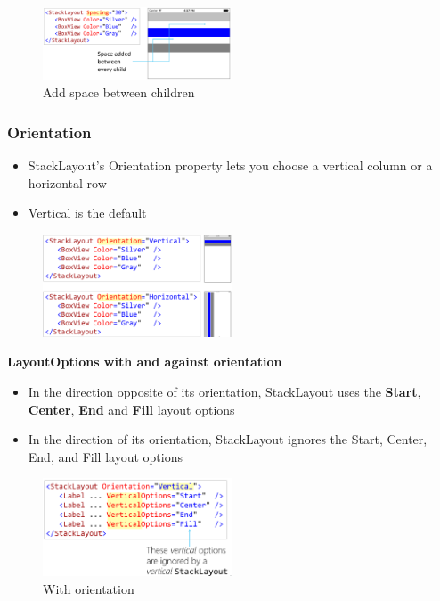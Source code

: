 \documentclass{article}
\newcommand{\bold}[1]{\textbf{#1}}
\begin{document}
\begin{figure}[H]
    \centering
    \includegraphics[width=0.5\textwidth]{xaml-stacklayout-spacing.png}
    \caption{Add space between children}
\end{figure}

\subsubsection{Orientation}



\begin{itemize}
    \item StackLayout's Orientation property lets you choose a vertical column or a horizontal row
    \item Vertical is the default
\end{itemize}

\begin{figure}[H]
    \centering
    \includegraphics[width=0.5\textwidth]{xaml-stacklayout-orientation.png}
    \caption{}
\end{figure}

\bold{LayoutOptions with and against orientation}

\begin{itemize}
    \item In the direction opposite of its orientation, StackLayout uses the \bold{Start}, \bold{Center}, \bold{End} and \bold{Fill} layout options
    \item In the direction of its orientation, StackLayout ignores the Start, Center, End, and Fill layout options
\end{itemize}

\begin{figure}[H]
    \centering
    \includegraphics[width=0.5\textwidth]{xaml-stacklayout-orientation3.png}
    \caption{With orientation}
\end{figure}
\end{document}

